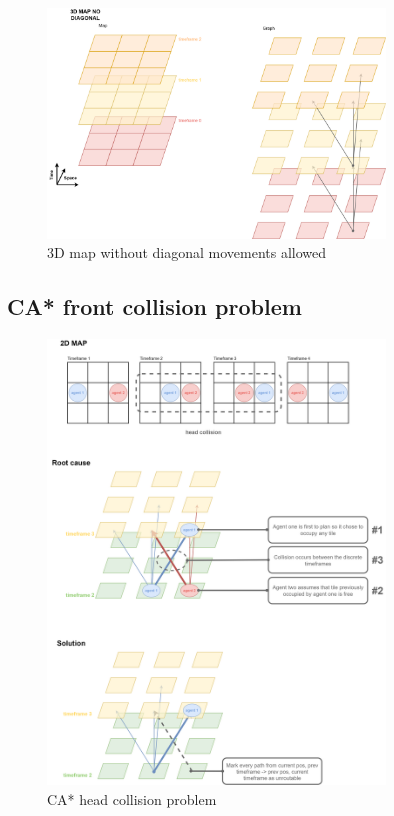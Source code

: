 \begin{figure}[H]
    \centering
    \includegraphics[width=0.8\textwidth]{pictures/map_3D_no_diag.png}
    \caption{ 3D map without diagonal movements allowed }
    \label{fig:map_3D_no_diag}
\end{figure}

\subsection{CA* front collision problem}

\begin{figure}[H]
    \centering
    \includegraphics[width=0.8\textwidth]{pictures/head_collision_problem.png}
    \caption{ CA* head collision problem}
    \label{fig:head_collision}
\end{figure}